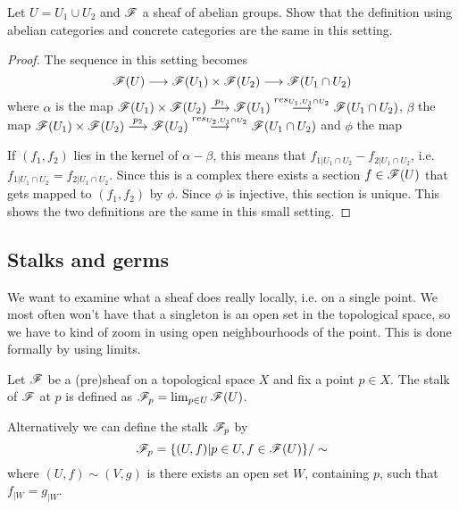 \begin{problem}
Let $U=U_1\cup U_2$ and $\mathscr{F}$ a sheaf of abelian groups. Show that the definition using abelian categories and concrete categories are the same in this setting. 
\begin{proof}
The sequence in this setting becomes
\begin{equation*}
    \mathscr{F}(U)\longrightarrow \mathscr{F}(U_1)\times \mathscr{F}(U_2) \longrightarrow \mathscr{F}(U_1\cap U_2)
\end{equation*}
where $\alpha$ is the map $\mathscr{F}(U_1)\times \mathscr{F}(U_2)\overset{p_1}\longrightarrow \mathscr{F}(U_1)\overset{res_{U_1, U_1\cap U_2}}\longrightarrow \mathscr{F}(U_1\cap U_2)$, $\beta$ the map $\mathscr{F}(U_1)\times \mathscr{F}(U_2)\overset{p_2}\longrightarrow \mathscr{F}(U_2)\overset{res_{U_2, U_1\cap U_2}}\longrightarrow \mathscr{F}(U_1\cap U_2)$ and $\phi$ the map 

If $(f_1, f_2)$ lies in the kernel of $\alpha - \beta$, this means that $f_{1\vert U_1\cap U_2} - f_{2\vert U_1\cap U_2}$, i.e. $f_{1\vert U_1\cap U_2} = f_{2\vert U_1\cap U_2}$. Since this is a complex there exists a section $f\in \mathscr{F}(U)$ that gets mapped to $(f_1, f_2)$ by $\phi$. Since $\phi$ is injective, this section is unique. This shows the two definitions are the same in this small setting.
\end{proof}
\end{problem}

\subsection{Stalks and germs}

We want to examine what a sheaf does really locally, i.e. on a single point. We most often won't have that a singleton is an open set in the topological space, so we have to kind of zoom in using open neighbourhoods of the point. This is done formally by using limits. 

\begin{definition}
Let $\mathscr{F}$ be a (pre)sheaf on a topological space $X$ and fix a point $p\in X$. The stalk of $\mathscr{F}$ at $p$ is defined as $\mathscr{F}_p = \lim_{p\in U}\mathscr{F}(U)$. 
\end{definition}

Alternatively we can define the stalk $\mathscr{F}_p$ by 
\begin{equation*}
    \mathscr{F}_p = \{ (U, f)\vert p\in U, f\in \mathscr{F}(U)\}/\sim
\end{equation*}
where $(U, f)\sim (V, g)$ is there exists an open set $W$, containing $p$, such that $f_{\vert W} = g_{\vert W}$. 


